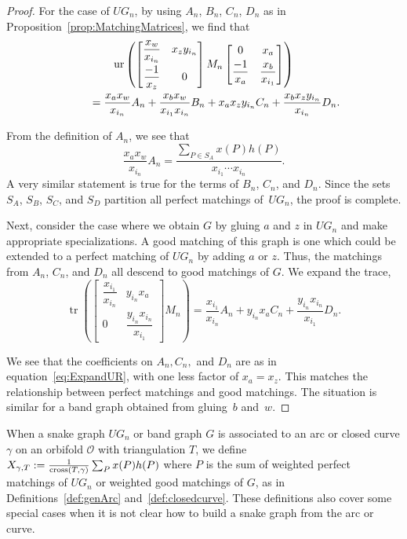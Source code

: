 \begin{proof}For the case of $UG_n$, by using $A_n$, $B_n$, $C_n$, $D_n$ as in Proposition~\ref{prop:MatchingMatrices}, we find that \begin{gather}
\operatorname{ur} \left( \begin{bmatrix} \dfrac{x_w}{x_{i_n}} & x_z y_{i_n} \vspace{1mm}\\ \dfrac{-1}{x_z} & 0 \end{bmatrix} M_n \begin{bmatrix} 0 & x_a \vspace{1mm}\\ \dfrac{-1}{x_a} & \dfrac{x_b}{x_{i_1}} \end{bmatrix}\right)\nonumber\\
\qquad{} = \frac{x_a x_w}{x_{i_n}} A_n + \frac{x_b x_w}{x_{i_1}x_{i_n}} B_n + x_a x_z y_{i_n} C_n + \frac{x_b x_z y_{i_n}}{x_{i_n}} D_n.\label{eq:ExpandUR}
\end{gather}

From the definition of $A_n$, we see that
\[ \frac{x_a x_w}{x_{i_n}} A_n = \frac{\sum_{P \in S_A} x(P)h(P)}{x_{i_1}\cdots x_{i_n}}.\] A very similar statement is true for the terms of $B_n$, $C_n$, and $D_n$. Since the sets $S_A$, $S_B$, $S_C$, and $ S_D$ partition all perfect matchings of~$UG_n$, the proof is complete.

Next, consider the case where we obtain $G$ by gluing $a$ and $z$ in $UG_n$ and make appropriate specializations. A good matching of this graph is one which could be extended to a perfect matching of $UG_n$ by adding $a$ or $z$. Thus, the matchings from $A_n$, $C_n$, and $D_n$ all descend to good matchings of $G$. We expand the trace, \[
\operatorname{tr} \left( \begin{bmatrix} \dfrac{x_{i_1}}{x_{i_n}} & y_{i_n} x_a\\ 0 & \dfrac{y_{i_n} x_{i_n}}{x_{i_1}} \end{bmatrix} M_n \right) = \frac{x_{i_1}}{x_{i_n}} A_n + y_{i_n} x_a C_n + \frac{y_{i_n} x_{i_n}}{x_{i_1}} D_n.
\]

We see that the coefficients on $A_n, C_n,$ and $D_n$ are as in equation~\eqref{eq:ExpandUR}, with one less factor of $x_a = x_z$. This matches the relationship between perfect matchings and good matchings. The situation is similar for a band graph obtained from gluing~$b$ and~$w$.
\end{proof}

When a snake graph $UG_n$ or band graph $G$ is associated to an arc or closed curve $\gamma$ on an orbifold $\mathcal{O}$ with triangulation $T$, we define $X_{\gamma, T} := \frac{1}{{\rm cross}(T,\gamma)}\sum_P x(P) h(P) $ where $P$ is the sum of weighted perfect matchings of $UG_n$ or weighted good matchings of $G$, as in Definitions~\ref{def:genArc} and~\ref{def:closedcurve}. These definitions also cover some special cases when it is not clear how to build a snake graph from the arc or curve.

